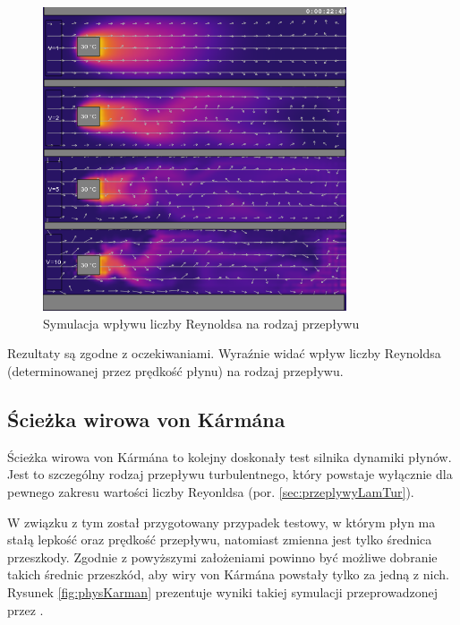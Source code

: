 \begin{figure}[!h]
\centering
\includegraphics[width=0.8\textwidth]{img/physics/laminarTurbulent}
\caption{Symulacja wpływu liczby Reynoldsa na rodzaj przepływu}
\label{fig:physLaminarTurbulent}
\end{figure}

Rezultaty są zgodne z oczekiwaniami. Wyraźnie widać wpływ liczby Reynoldsa
(determinowanej przez prędkość płynu) na rodzaj przepływu.

\subsection{Ścieżka wirowa von Kármána}

Ścieżka wirowa von Kármána to kolejny doskonały test silnika dynamiki płynów.
Jest to szczególny rodzaj przepływu turbulentnego, który powstaje wyłącznie dla
pewnego zakresu wartości liczby Reyonldsa (por. \ref{sec:przeplywyLamTur}).

W związku z tym został przygotowany przypadek testowy, w którym płyn ma stałą
lepkość oraz prędkość przepływu, natomiast zmienna jest tylko średnica
przeszkody. Zgodnie z powyższymi założeniami powinno być możliwe dobranie
takich średnic przeszkód, aby wiry von Kármána powstały tylko za jedną z nich.
Rysunek \ref{fig:physKarman} prezentuje wyniki takiej symulacji przeprowadzonej
przez \en.

